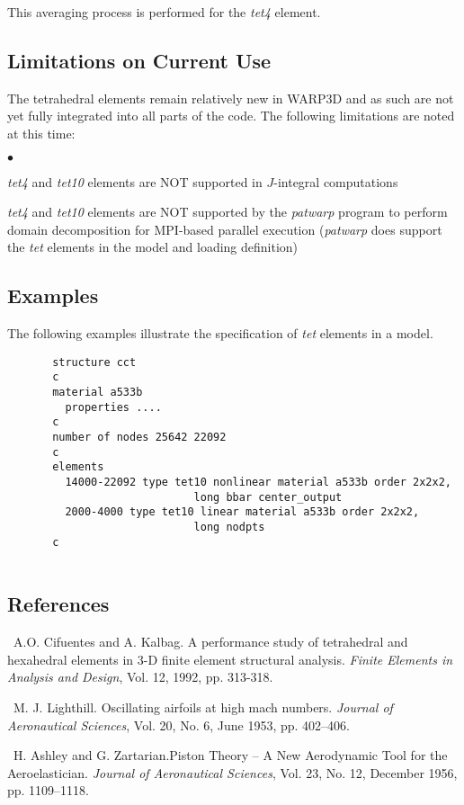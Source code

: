 \documentclass[11pt]{report}
\numberwithin{equation}{section}
\newcommand{\nf} {\normalsize}
\newcommand{\ti}{\emph}
\newcommand{\noi}{\noindent}
\newcommand{\tfour}{\ti{tet4}\xspace}
\newcommand{\tten}{\ti{tet10}\xspace}
\newcommand{\squishlisttwo}{
 \begin{list}{$\bullet$}
  { \setlength{\itemsep}{0pt}
     \setlength{\parsep}{0pt}
    \setlength{\topsep}{0pt}
    \setlength{\partopsep}{0pt}
    \setlength{\leftmargin}{2em}
    \setlength{\labelwidth}{1.5em}
    \setlength{\labelsep}{0.5em} } }
\newcommand{\squishend}{
  \end{list}  }
\newcounter{sectrefs}
\begin{document}
This averaging process is performed for the \tfour element.
\subsection {Limitations on Current Use}

\noi The tetrahedral elements remain relatively new in WARP3D and as such are not yet
fully integrated into all parts of the code. The following limitations are noted
at this time: 
\small
\squishlisttwo
\item \tfour and \tten elements are NOT supported in $J$-integral computations 

\item \tfour and \tten elements are NOT supported by the \ti{patwarp} program to perform
domain decomposition for MPI-based parallel execution (\ti{patwarp} does support the
\ti{tet} elements in the model and loading definition)

\squishend
\nf

\subsection {Examples}

\noi The following examples illustrate the specification 
of \ti{tet} elements in a model.
\small \begin{verbatim}
       structure cct
       c
       material a533b 
         properties ....
       c
       number of nodes 25642 22092
       c
       elements
         14000-22092 type tet10 nonlinear material a533b order 2x2x2,
                             long bbar center_output
         2000-4000 type tet10 linear material a533b order 2x2x2,
                             long nodpts
       c
                                            
\end{verbatim}\normalsize


\subsection {References}
\small

\medskip
\noi [\refstepcounter{sectrefs}\label {R:CK1992}\thesectrefs]~A.O. Cifuentes and 
A. Kalbag. A performance study of tetrahedral and hexahedral elements in 
3-D finite element structural analysis. \ti{Finite Elements in Analysis 
and Design}, Vol. 12, 1992, pp. 313-318.


\medskip
{}~M. J. Lighthill.
Oscillating airfoils at high mach numbers. \ti{Journal of Aeronautical Sciences}, 
Vol. 20, No. 6, June 1953, pp. 402--406. 
\medskip

~H. Ashley and G. 
Zartarian.Piston Theory -- A New Aerodynamic Tool for the Aeroelastician.
\ti{Journal of Aeronautical Sciences}, Vol. 23, No. 12, December 1956, pp. 1109--1118.
\end{document}
